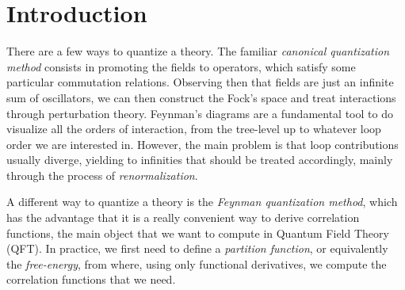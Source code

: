 \chapter{Introduction}
There are a few ways to quantize a theory. The familiar \emph{canonical quantization method} consists in promoting the fields to operators, which satisfy some particular commutation relations. Observing then that fields are just an infinite sum of oscillators, we can then construct the Fock's space and treat interactions through perturbation theory. Feynman's diagrams are a fundamental tool to do visualize all the orders of interaction, from the tree-level up to whatever loop order we are interested in. However, the main problem is that loop contributions usually diverge, yielding to infinities that should be treated accordingly, mainly through the process of \emph{renormalization}.

A different way to quantize a theory is the \emph{Feynman quantization method}, which has the advantage that it is a really convenient way to derive correlation functions, the main object that we want to compute in Quantum Field Theory (QFT). In practice, we first need to define a \emph{partition function}, or equivalently the \emph{free-energy}, from where, using only functional derivatives, we compute the correlation functions that we need. 

